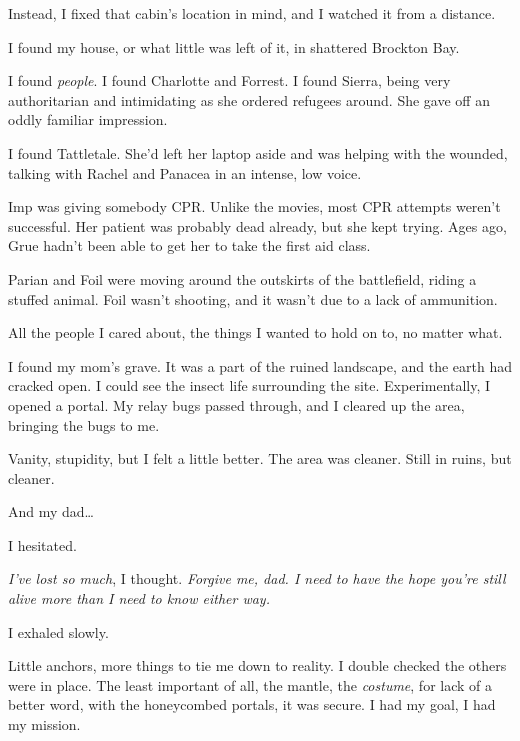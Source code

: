 Instead, I fixed that cabin's location in mind, and I watched it from a distance.



I found my house, or what little was left of it, in shattered Brockton Bay.



I found \emph{people}.  I found Charlotte and Forrest.  I found Sierra, being very authoritarian and intimidating as she ordered refugees around.  She gave off an oddly familiar impression.



I found Tattletale.  She'd left her laptop aside and was helping with the wounded, talking with Rachel and Panacea in an intense, low voice.



Imp was giving somebody CPR.  Unlike the movies, most CPR attempts weren't successful.  Her patient was probably dead already, but she kept trying.  Ages ago, Grue hadn't been able to get her to take the first aid class.



Parian and Foil were moving around the outskirts of the battlefield, riding a stuffed animal.  Foil wasn't shooting, and it wasn't due to a lack of ammunition.



All the people I cared about, the things I wanted to hold on to, no matter what.



I found my mom's grave.  It was a part of the ruined landscape, and the earth had cracked open.  I could see the insect life surrounding the site.  Experimentally, I opened a portal.  My relay bugs passed through, and I cleared up the area, bringing the bugs to me.



Vanity, stupidity, but I felt a little better.  The area was cleaner.  Still in ruins, but cleaner.



And my dad\ldots



I hesitated.



\emph{I've lost so much}, I thought.  \emph{Forgive me, dad.  I need to have the hope you're still alive more than I need to know either way.}



I exhaled slowly.



Little anchors, more things to tie me down to reality.  I double checked the others were in place.  The least important of all, the mantle, the \emph{costume}, for lack of a better word, with the honeycombed portals, it was secure.  I had my goal, I had my mission.



